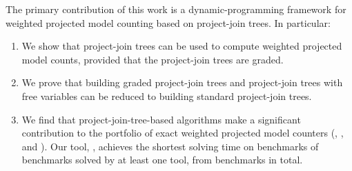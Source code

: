 The primary contribution of this work is a dynamic-programming framework for weighted projected model counting based on project-join trees. In particular:
\begin{enumerate}
    \item We show that project-join trees can be used to compute weighted projected model counts, provided that the project-join trees are graded.
    \item We prove that building graded project-join trees and project-join trees with free variables can be reduced to building standard project-join trees.
    \item We find that project-join-tree-based algorithms make a significant contribution to the portfolio of exact weighted projected model counters (\dfp{}, \projmc{}, and \ssat{}).
    Our tool, \procount{}, achieves the shortest solving time on \dpmcFastestBenchmarks{} benchmarks of \solvedBenchmarks{} benchmarks solved by at least one tool, from \benchmarks{} benchmarks in total.
\end{enumerate}